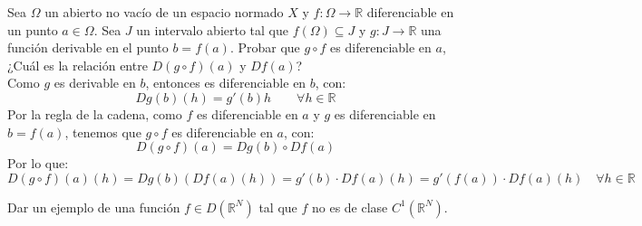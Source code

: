 \begin{ejercicio}
Sea \( \Omega \) un abierto no vacío de un espacio normado \( X \) y \( f : \Omega \rightarrow \mathbb{R} \) diferenciable en un punto \( a \in \Omega \). Sea \( J \) un intervalo abierto tal que \( f(\Omega) \subseteq J \) y \( g : J \rightarrow \mathbb{R} \) una función derivable en el punto \( b = f(a) \). Probar que \( g \circ f \) es diferenciable en \( a \), ¿Cuál es la relación entre \( D(g \circ f)(a) \) y \( Df(a) \)?\\

\noindent
Como $g$ es derivable en $b$, entonces es diferenciable en $b$, con:
\begin{equation*}
    Dg(b)(h) = g'(b)h \qquad \forall h\in \mathbb{R}
\end{equation*}
Por la regla de la cadena, como $f$ es diferenciable en $a$ y $g$ es diferenciable en $b = f(a)$, tenemos que $g\circ f$ es diferenciable en $a$, con:
\begin{equation*}
    D(g\circ f)(a) = Dg(b)\circ Df(a)
\end{equation*}
Por lo que:
\begin{equation*}
    D(g\circ f)(a)(h) = Dg(b)(Df(a)(h)) = g'(b)\cdot Df(a)(h) = g'(f(a)) \cdot Df(a)(h) \quad \forall h\in \mathbb{R}
\end{equation*}
\end{ejercicio}

\begin{ejercicio}
Dar un ejemplo de una función \( f \in D(\mathbb{R}^N) \) tal que \( f \) no es de clase \( C^1(\mathbb{R}^N) \).
\end{ejercicio}
    
